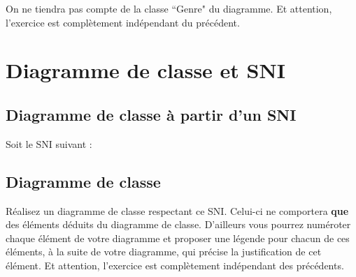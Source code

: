 \documentclass[12pt]{article}
\def\dc{\textsf{diagramme de classe}}
\def\sni{\textsf{SNI}}
\begin{document}
On ne tiendra pas compte de la classe ``Genre" du diagramme. Et attention, l'exercice est complètement indépendant du précédent.

\begin{center}
\fbox{
  \begin{minipage}{6in}
    \hfill\vspace{8.5in}
  \end{minipage}
}
\end{center}

\section{Diagramme de classe et SNI}

\subsection*{Diagramme de classe à partir d'un SNI}

Soit le \sni{} suivant :

\begin{center}
\end{center}

\newpage
\subsection{Diagramme de classe}

Réalisez un \dc{} respectant ce \sni. Celui-ci ne comportera \textbf{que} des éléments déduits du \dc.
D'ailleurs vous pourrez numéroter chaque élément de votre diagramme et proposer une légende pour chacun
de ces éléments, à la suite de votre diagramme, qui précise la justification de cet élément.
Et attention, l'exercice est complètement indépendant des précédents.
\end{document}

